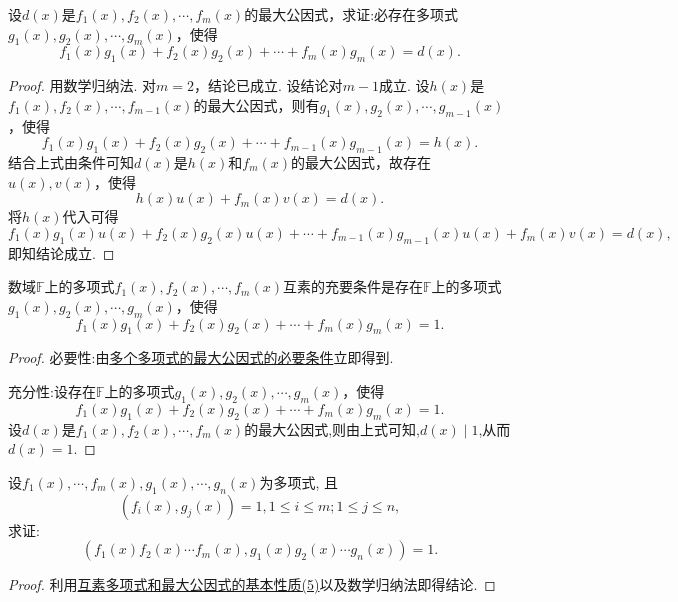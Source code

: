 \documentclass[../../main.tex]{subfiles}%
\begin{document}
\begin{theorem}[多个多项式的最大公因式的必要条件]\label{theorem:多个多项式的最大公因式的必要条件}
设\(d(x)\)是\(f_1(x),f_2(x),\cdots,f_m(x)\)的最大公因式，求证:必存在多项式\(g_1(x),g_2(x),\cdots,g_m(x)\)，使得
\[
f_1(x)g_1(x)+f_2(x)g_2(x)+\cdots + f_m(x)g_m(x)=d(x).
\]
\end{theorem}
\begin{proof}

用数学归纳法. 对\(m = 2\)，结论已成立. 设结论对\(m - 1\)成立. 设\(h(x)\)是\(f_1(x),f_2(x),\cdots,f_{m - 1}(x)\)的最大公因式，则有\(g_1(x),g_2(x),\cdots,g_{m - 1}(x)\)，使得
\[
f_1(x)g_1(x)+f_2(x)g_2(x)+\cdots + f_{m - 1}(x)g_{m - 1}(x)=h(x).
\]
结合上式由条件可知\(d(x)\)是\(h(x)\)和\(f_m(x)\)的最大公因式，故存在\(u(x),v(x)\)，使得
\[
h(x)u(x)+f_m(x)v(x)=d(x).
\]
将\(h(x)\)代入可得
\[
f_1(x)g_1(x)u(x)+f_2(x)g_2(x)u(x)+\cdots + f_{m - 1}(x)g_{m - 1}(x)u(x)+f_m(x)v(x)=d(x),
\]
即知结论成立.

\end{proof}

\begin{corollary}[多个多项式互素的充要条件]\label{corollary:多个多项式互素的充要条件}
数域\(\mathbb{F}\)上的多项式\(f_1(x),f_2(x),\cdots,f_m(x)\)互素的充要条件是存在\(\mathbb{F}\)上的多项式\(g_1(x),g_2(x),\cdots,g_m(x)\)，使得
\[
f_1(x)g_1(x)+f_2(x)g_2(x)+\cdots + f_m(x)g_m(x)=1.
\]
\end{corollary}
\begin{proof}

必要性:由\hyperref[theorem:多个多项式的最大公因式的必要条件]{多个多项式的最大公因式的必要条件}立即得到.

充分性:设存在\(\mathbb{F}\)上的多项式\(g_1(x),g_2(x),\cdots,g_m(x)\)，使得
\[
f_1(x)g_1(x)+f_2(x)g_2(x)+\cdots + f_m(x)g_m(x)=1.
\]
设\(d(x)\)是\(f_1(x),f_2(x),\cdots,f_m(x)\)的最大公因式,则由上式可知,$d(x)\mid 1$,从而$d(x)=1$.

\end{proof}

\begin{proposition}[两两互素的多项式组的乘积也互素]\label{proposition:两两互素的多项式组的乘积也互素}
设\(f_1(x),\cdots,f_m(x),g_1(x),\cdots,g_n(x)\)为多项式, 且
\[
(f_i(x),g_j(x)) = 1, 1\leqslant  i\leqslant  m; 1\leqslant  j\leqslant  n,
\]
求证:
\[
(f_1(x)f_2(x)\cdots f_m(x),g_1(x)g_2(x)\cdots g_n(x)) = 1.
\]
\end{proposition}
\begin{proof}

利用\hyperref[proposition:互素多项式和最大公因式的基本性质]{互素多项式和最大公因式的基本性质(5)}以及数学归纳法即得结论.

\end{proof}
\end{document}
